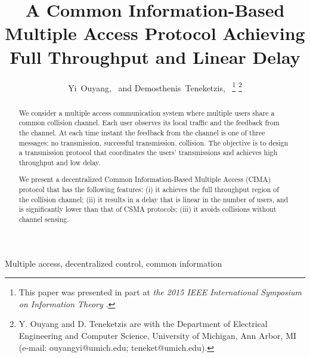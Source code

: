 \documentclass[onecolumn,draftcls]{IEEEtran}
\begin{document}
\title{A Common Information-Based Multiple Access Protocol Achieving Full Throughput and Linear Delay}





\author{Yi~Ouyang,~ and Demosthenis~Teneketzis,~
\thanks{This paper was presented in part at \textit{the 2015 IEEE International Symposium on Information Theory} \cite{ouyangISIT}. 
}
\thanks{Y. Ouyang and D. Teneketzis are with the Department of Electrical Engineering and Computer Science, University of Michigan, Ann Arbor, MI (e-mail: ouyangyi@umich.edu; teneket@umich.edu).}
 }



















\maketitle


\begin{abstract}
We consider a multiple access communication system where multiple users share a common collision channel.
Each user observes its local traffic and the feedback from the channel.
At each time instant the feedback from the channel is one of three messages: no transmission, successful transmission, collision.
The objective is to design a transmission protocol that coordinates the users' transmissions and achieves high throughput and low delay.

We present a decentralized Common Information-Based Multiple Access (CIMA) protocol that has the following features:
(i) it achieves the full throughput region of the collision channel;
(ii) it results in a delay that is linear in the number of users, and is significantly lower than that of CSMA protocols;
(iii) it avoids collisions without channel sensing.
\end{abstract}

\begin{IEEEkeywords}
Multiple access, decentralized control, common information
\end{IEEEkeywords}
\end{document}
